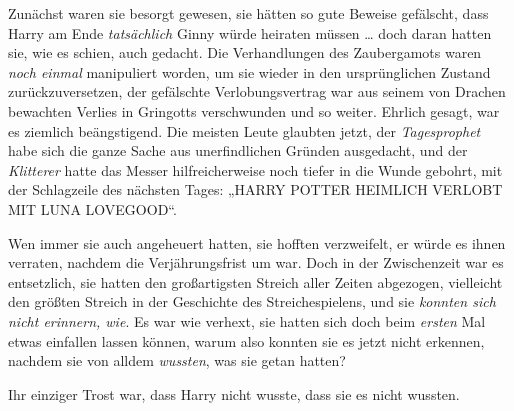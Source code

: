 Zunächst waren sie besorgt gewesen, sie hätten so gute Beweise gefälscht, dass Harry am Ende \emph{tatsächlich} Ginny würde heiraten müssen … doch daran hatten sie, wie es schien, auch gedacht. Die Verhandlungen des Zaubergamots waren \emph{noch einmal} manipuliert worden, um sie wieder in den ursprünglichen Zustand zurückzuversetzen, der gefälschte Verlobungsvertrag war aus seinem von Drachen bewachten Verlies in Gringotts verschwunden und so weiter. Ehrlich gesagt, war es ziemlich beängstigend. Die meisten Leute glaubten jetzt, der \emph{Tagesprophet} habe sich die ganze Sache aus unerfindlichen Gründen ausgedacht, und der \emph{Klitterer} hatte das Messer hilfreicherweise noch tiefer in die Wunde gebohrt, mit der Schlagzeile des nächsten Tages:
„HARRY POTTER HEIMLICH VERLOBT MIT LUNA LOVEGOOD“.

Wen immer sie auch angeheuert hatten, sie hofften verzweifelt, er würde es ihnen verraten, nachdem die Verjährungsfrist um war. Doch in der Zwischenzeit war es entsetzlich, sie hatten den großartigsten Streich aller Zeiten abgezogen, vielleicht den größten Streich in der Geschichte des Streichespielens, und sie \emph{konnten sich nicht erinnern, wie}. Es war wie verhext, sie hatten sich doch beim \emph{ersten} Mal etwas einfallen lassen können, warum also konnten sie es jetzt nicht erkennen, nachdem sie von alldem \emph{wussten}, was sie getan hatten?

Ihr einziger Trost war, dass Harry nicht wusste, dass sie es nicht wussten.

